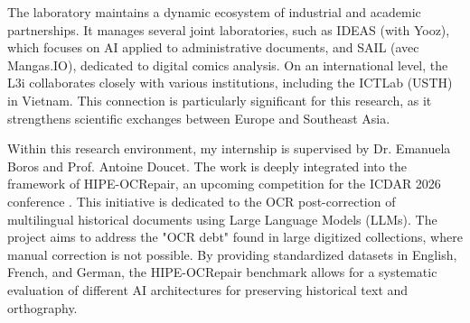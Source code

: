 \documentclass[11pt]{extarticle}
\begin{document}
The laboratory maintains a dynamic ecosystem of industrial and academic partnerships. It manages several joint laboratories, such as IDEAS (with Yooz), which focuses on AI applied to administrative documents, and SAIL (avec Mangas.IO), dedicated to digital comics analysis. On an international level, the L3i collaborates closely with various institutions, including the ICTLab (USTH) in Vietnam. This connection is particularly significant for this research, as it strengthens scientific exchanges between Europe and Southeast Asia.

Within this research environment, my internship is supervised by Dr. Emanuela Boros and Prof. Antoine Doucet. The work is deeply integrated into the framework of HIPE-OCRepair\cite{hipe_ocrepair_2026}, an upcoming competition for the ICDAR 2026 conference \cite{icdar_2026}. This initiative is dedicated to the OCR post-correction of multilingual historical documents using Large Language Models (LLMs). The project aims to address the "OCR debt" found in large digitized collections, where manual correction is not possible. By providing standardized datasets in English, French, and German, the HIPE-OCRepair benchmark allows for a systematic evaluation of different AI architectures for preserving historical text and orthography.



\end{document}
